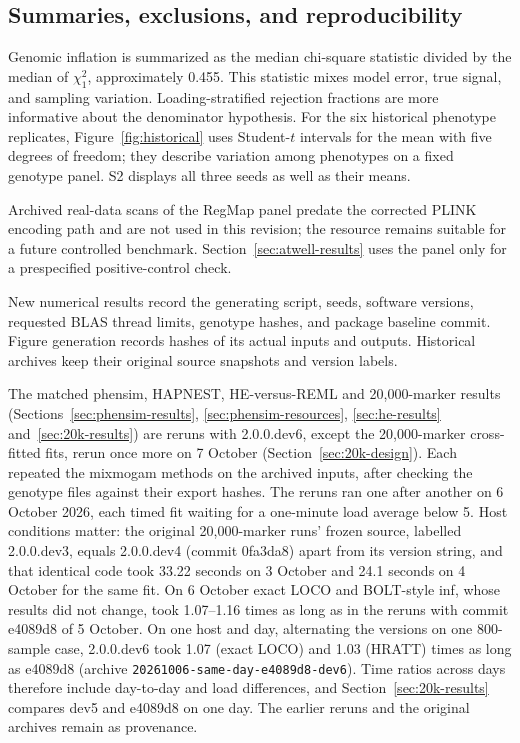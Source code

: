 \documentclass[11pt]{article}
\newcommand{\code}[1]{\texttt{#1}}
\begin{document}
\subsection{Summaries, exclusions, and reproducibility}
\label{sec:summaries}

Genomic inflation is summarized as the median chi-square statistic
divided by the median of $\chi^2_1$, approximately 0.455. This statistic
mixes model error, true signal, and sampling variation. Loading-stratified rejection fractions
are more informative about the denominator hypothesis. For the six
historical phenotype replicates, Figure~\ref{fig:historical} uses
Student-$t$ intervals for the mean with five degrees of freedom; they
describe variation among phenotypes on a fixed genotype panel. S2 displays all
three seeds as well as their means.

Archived real-data scans of the RegMap panel \citep{horton2012} predate
the corrected PLINK encoding path and are not used in this revision; the
resource remains suitable for a future controlled benchmark.
Section~\ref{sec:atwell-results} uses the panel
only for a prespecified positive-control check.

New numerical results record the generating script, seeds, software
versions, requested BLAS thread limits, genotype hashes, and package
baseline commit. Figure generation records hashes of its actual inputs
and outputs. Historical archives keep their original source snapshots and
version labels.

The matched phensim, HAPNEST, HE-versus-REML and 20,000-marker results
(Sections~\ref{sec:phensim-results}, \ref{sec:phensim-resources},
\ref{sec:he-results} and~\ref{sec:20k-results}) are reruns with
2.0.0.dev6, except the 20,000-marker cross-fitted fits, rerun once more on
7 October (Section~\ref{sec:20k-design}). Each repeated the mixmogam methods on the
archived inputs, after checking the genotype files against their export
hashes. The reruns ran one after another on 6 October 2026, each timed
fit waiting for a one-minute load average below 5.
Host conditions matter: the original 20,000-marker runs' frozen source,
labelled 2.0.0.dev3, equals 2.0.0.dev4 (commit 0fa3da8) apart from its version
string, and that identical code took 33.22 seconds on 3 October and 24.1
seconds on 4 October for the same fit. On 6 October exact LOCO and
BOLT-style inf, whose results did not change, took 1.07--1.16 times as long as in
the reruns with commit e4089d8 of 5 October. On one host and day, alternating
the versions on one 800-sample case, 2.0.0.dev6 took 1.07 (exact LOCO) and
1.03 (HRATT) times as long as e4089d8 (archive
\code{20261006-}\allowbreak\code{same-day-}\allowbreak\code{e4089d8-dev6}).
Time ratios across days therefore include day-to-day and load differences,
and Section~\ref{sec:20k-results} compares dev5 and e4089d8 on one day.
The earlier reruns and the original archives remain as provenance.
\end{document}
